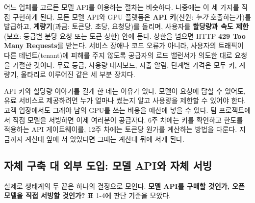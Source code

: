 어느 업체를 고르든 모델 API를 이용하는 절차는 비슷하다. 나중에는 이 세 가지를 직접 구현하게 된다. 모든 모델 API와 GPU 플랫폼은 \textbf{API 키}(신원: \textit{누가} 호출하는가)를 발급하고, \textbf{계량기}(과금: 토큰당, 초당, 요청당)를 돌리며, 사용자를 \textbf{할당량과 속도 제한}(보호: 등급별 분당 요청 또는 토큰 상한) 안에 둔다. 상한을 넘으면 HTTP \textbf{429 Too Many Requests}를 받는다. 서비스 장애나 코드 오류가 아니라, 사용자의 트래픽이 다른 테넌트(tenant)에 피해를 주지 않도록 공급자의 로드 밸런서가 의도한 대로 요청을 거절한 것이다. 무료 등급, 사용량 대시보드, 지출 알림, 단계별 가격은 모두 키, 계량기, 울타리로 이루어진 같은 세 부분 장치다.

API 키와 할당량 이야기를 길게 한 데는 이유가 있다. 모델이 요청에 답할 수 있어도, 유료 서비스로 제공하려면 누가 얼마나 썼는지 알고 사용량을 제한할 수 있어야 한다. 고객 입장에서도 그래야 남의 GPU를 쓰는 비용을 예산에 넣을 수 있다. 팀 프로젝트에서 직접 모델을 서빙하면 이제 여러분이 공급자다. 6주 차에는 키를 확인하고 한도를 적용하는 API 게이트웨이를, 12주 차에는 토큰당 원가를 계산하는 방법을 다룬다. 지금까지 계산대 앞에 서 있었다면 그때는 계산대 뒤에 서게 된다.

\subsection*{자체 구축 대 외부 도입: 모델 API와 자체 서빙}

실제로 생태계의 두 끝은 하나의 결정으로 모인다. \textbf{모델 API를 구매할 것인가, 오픈 모델을 직접 서빙할 것인가?} 표 1-4에 판단 기준을 모았다.

